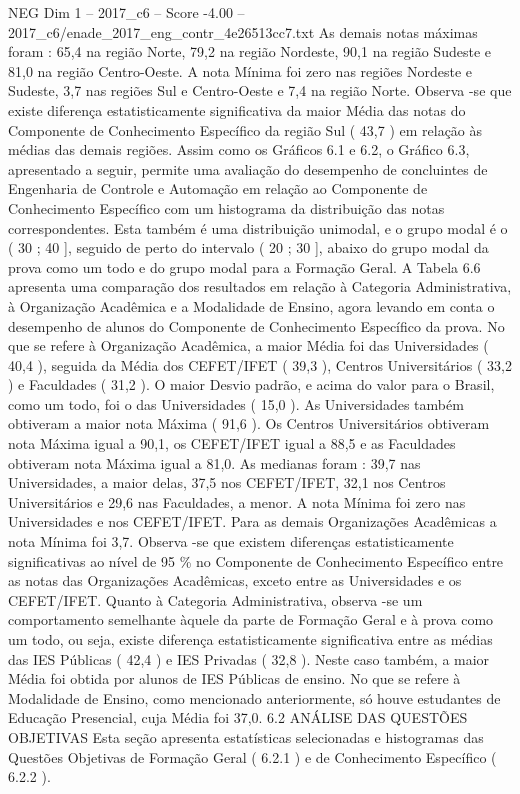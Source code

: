 \begin{textsample}{NEG Dim 1 – 2017\_c6 – Score -4.00 – 2017\_c6/enade\_2017\_eng\_contr\_4e26513cc7.txt}
As demais notas máximas foram : 65,4 na região Norte, 79,2 na região Nordeste, 90,1 na região Sudeste e 81,0 na região Centro-Oeste.
A nota Mínima foi zero nas regiões Nordeste e Sudeste, 3,7 nas regiões Sul e Centro-Oeste e 7,4 na região Norte.
Observa -se que existe diferença estatisticamente significativa da maior Média das notas do Componente de Conhecimento Específico da região Sul ( 43,7 ) em relação às médias das demais regiões.
Assim como os Gráficos 6.1 e 6.2, o Gráfico 6.3, apresentado a seguir, permite uma avaliação do desempenho de concluintes de Engenharia de Controle e Automação em relação ao Componente de Conhecimento Específico com um histograma da distribuição das notas correspondentes.
Esta também é uma distribuição unimodal, e o grupo modal é o ( 30 ; 40 ], seguido de perto do intervalo ( 20 ; 30 ], abaixo do grupo modal da prova como um todo e do grupo modal para a Formação Geral.
A Tabela 6.6 apresenta uma comparação dos resultados em relação à Categoria Administrativa, à Organização Acadêmica e a Modalidade de Ensino, agora levando em conta o desempenho de alunos do Componente de Conhecimento Específico da prova.
No que se refere à Organização Acadêmica, a maior Média foi das Universidades ( 40,4 ), seguida da Média dos CEFET/IFET ( 39,3 ), Centros Universitários ( 33,2 ) e Faculdades ( 31,2 ).
O maior Desvio padrão, e acima do valor para o Brasil, como um todo, foi o das Universidades ( 15,0 ).
As Universidades também obtiveram a maior nota Máxima ( 91,6 ).
Os Centros Universitários obtiveram nota Máxima igual a 90,1, os CEFET/IFET igual a 88,5 e as Faculdades obtiveram nota Máxima igual a 81,0.
As medianas foram : 39,7 nas Universidades, a maior delas, 37,5 nos CEFET/IFET, 32,1 nos Centros Universitários e 29,6 nas Faculdades, a menor.
A nota Mínima foi zero nas Universidades e nos CEFET/IFET.
Para as demais Organizações Acadêmicas a nota Mínima foi 3,7.
Observa -se que existem diferenças estatisticamente significativas ao nível de 95 \% no Componente de Conhecimento Específico entre as notas das Organizações Acadêmicas, exceto entre as Universidades e os CEFET/IFET.
Quanto à Categoria Administrativa, observa -se um comportamento semelhante àquele da parte de Formação Geral e à prova como um todo, ou seja, existe diferença estatisticamente significativa entre as médias das IES Públicas ( 42,4 ) e IES Privadas ( 32,8 ).
Neste caso também, a maior Média foi obtida por alunos de IES Públicas de ensino.
No que se refere à Modalidade de Ensino, como mencionado anteriormente, só houve estudantes de Educação Presencial, cuja Média foi 37,0. 6.2 ANÁLISE DAS QUESTÕES OBJETIVAS Esta seção apresenta estatísticas selecionadas e histogramas das Questões Objetivas de Formação Geral ( 6.2.1 ) e de Conhecimento Específico ( 6.2.2 ).

\end{textsample}
